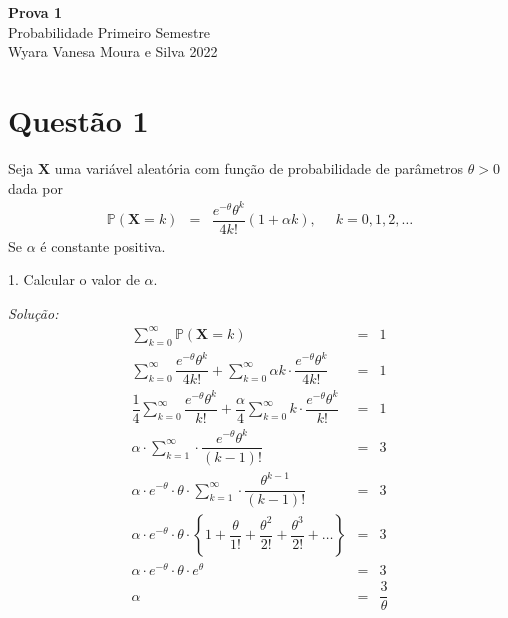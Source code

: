 \documentclass[a4paper, 11pt]{article}
\begin{document}
\noindent
{\Large\textbf{Prova 1} \hfill \\
Probabilidade \hfill Primeiro Semestre\\
Wyara Vanesa Moura e Silva \hfill 2022\\}

\section*{Questão 1} Seja $\mathbf{X}$ uma variável aleatória com função de probabilidade de parâmetros $\theta > 0$ dada por 
\begin{equation*}
\begin{array}{lclll}
\mathds{P}(\mathbf{X} = k) & = & \dfrac{e^{-\theta}\theta^{k}}{4k!}(1 + \alpha k), \; & \; k=0,1,2,\ldots
\end{array}
\end{equation*}
\noindent
Se $\alpha$ é constante positiva.

1. Calcular o valor de $\alpha$.

\noindent
\textit{Solução:} 
\begin{equation*}
\begin{array}{rclll}
\displaystyle\sum_{k=0}^{\infty}\mathds{P}(\mathbf{X} = k) & = & 1 \\[15pt]

\displaystyle\sum_{k=0}^{\infty}\dfrac{e^{-\theta}\theta^{k}}{4k!} + \displaystyle\sum_{k=0}^{\infty}\alpha k \cdot \dfrac{e^{-\theta}\theta^{k}}{4k!} & = & 1 \\[10pt]

\dfrac{1}{4}\displaystyle\sum_{k=0}^{\infty}\dfrac{e^{-\theta}\theta^{k}}{k!} + \dfrac{\alpha}{4}\displaystyle\sum_{k=0}^{\infty} k \cdot \dfrac{e^{-\theta}\theta^{k}}{k!} & = & 1 \\[10pt]

\alpha \cdot \displaystyle\sum_{k=1}^{\infty}\cdot \dfrac{e^{-\theta}\theta^{k}}{(k-1)!} & = & 3 \\[10pt]

\alpha \cdot e^{-\theta} \cdot \theta \cdot \displaystyle\sum_{k=1}^{\infty}\cdot \dfrac{\theta^{k-1}}{(k-1)!} & = & 3 \\[10pt]

\alpha \cdot e^{-\theta} \cdot \theta \cdot \left\{ 1 + \dfrac{\theta}{1!} + \dfrac{\theta^{2}}{2!} + \dfrac{\theta^{3}}{2!} + \ldots\right\} & = & 3 \\[10pt]

\alpha \cdot e^{-\theta} \cdot \theta \cdot e^{\theta} & = & 3 \\
\alpha & = & \dfrac{3}{\theta} \\
\end{array}
\end{equation*}
\end{document}
